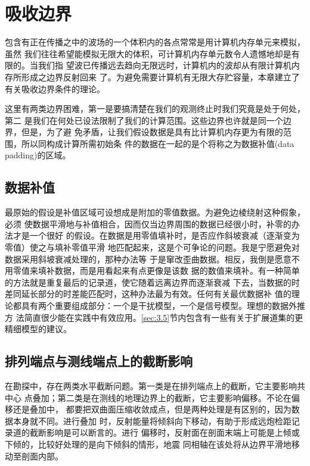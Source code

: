 \section{吸收边界}
\label{sec:4.4}

包含有正在传播之中的波场的一个体积内的各点常常是用计算机内存单元来模拟，虽然
我们往往希望能模拟无限大的体积，可计算机内存单元数令人遗憾地却是有限的。当我们指
望波已传播远去趋向无限远时，计算机内的波却从有限计算机内存所形成之边界反射回来
了。为避免需要计算机有无限大存贮容量，本章建立了有关吸收边界条件的理论。

这里有两类边界困难，第一是要搞清楚在我们的观测终止时我们究竟是处于何处，第二
是我们在何处已设法限制了我们的计算范围。这些边界也许就是同一个边界，但是，为了避
免矛盾，让我们假设数据是具有比计算机内存更为有限的范围，所以同构成计算所需初始条
件的数据在一起的是个将称之为数据补值(data padding)的区域。

\subsection{数据补值}
\label{sec:4.4.1}

最原始的假设是补值区域可设想成是附加的零值数据。为避免边棱绕射这种假象，必须
使数据平滑地与补值相合，因而仅当边界周围的数据已经很小时，补零的办法才是一个很好
的假设。在数据是用零值填补时，是否应作斜坡衰减（逐渐变为零值）使之与填补零值平滑
地匹配起来，这是个可争论的问题。我是宁愿避免对数据采用斜坡衰减处理的，那种办法等
于是窜改歪曲数据。相反，我倒是愿意不用零值来填补数据，而是用看起来有点更像是该数
据的数值来填补。有一种简单的方法就是重复最后的记录道，使它随着远离边界而逐渐衰减
下去，当数据的时差同延长部分的时差能匹配时，这种办法最为有效。任何有关最优数据补
值的理论都具有两个重要组成部分：一个是干扰模型，一个是信号模型。理想的数据外推方
法简直很少能在实践中有效应用。\ref{sec:3.5}节内包含有一些有关于扩展道集的更精细模型的建议。


\subsection{排列端点与测线端点上的截断影响 }
\label{sec:4.4.2}

在勘探中，存在两类水平截断问题。第一类是在排列端点上的截断，它主要影响共中心
点叠加；第二类是在测线的地理边界上的截断，它主要影响偏移。不论在偏移还是叠加中，
都要把双曲面压缩收敛成点，但是两种处理是有区别的，因为数据本身就不同。进行叠加
时，反射能量将倾斜向下移动，有助于形成远炮检距记录道的截断影响是可以断言的。进行
偏移时，反射面在剖面末端上可能是上倾或下倾的，比较好处理的是向下倾斜的情形，地震
同相轴在该处将从边界平滑地移动至剖面内部。

